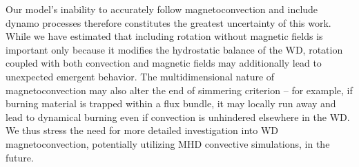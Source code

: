 
Our model's inability to accurately follow magnetoconvection and include dynamo processes therefore constitutes the greatest uncertainty of this work.  While we have estimated that including rotation without magnetic fields is important only because it modifies the hydrostatic balance of the WD, rotation coupled with both convection and magnetic fields may additionally lead to unexpected emergent behavior.  The multidimensional nature of magnetoconvection may also alter the end of simmering criterion -- for example, if burning material is trapped within a flux bundle, it may locally run away and lead to dynamical burning even if convection is unhindered elsewhere in the WD.  We thus stress the need for more detailed investigation into WD magnetoconvection, potentially utilizing MHD convective simulations, in the future.



  




